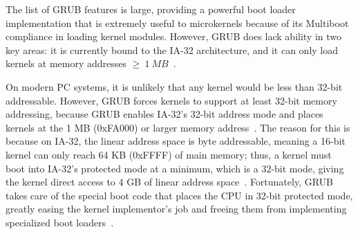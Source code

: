 The list of GRUB features is large, providing a powerful boot loader
implementation that is extremely useful to microkernels because of
its Multiboot compliance in loading kernel modules.  However, GRUB
does lack ability in two key areas: it is currently bound to the IA-32
architecture, and it can only load kernels at memory addresses
$\geq~1~MB$~\cite{grub_info}.

On modern PC systems, it is unlikely that any kernel would be less than 32-bit
addressable.  However, GRUB forces kernels to support at least 32-bit memory
addressing, because GRUB enables IA-32's 32-bit address mode and places
kernels at the 1 MB (0xFA000) or larger memory address~\cite{grub_info}.  The
reason for
this is because on IA-32, the linear address space is byte addressable,
meaning a 16-bit kernel can only reach 64 KB (0xFFFF) of main memory; thus, a
kernel
must boot into IA-32's protected mode at a minimum, which is a 32-bit mode,
giving the kernel direct access to 4 GB of linear address
space~\cite{ia32-1-2004}.  Fortunately, GRUB takes care of the special boot
code that places the CPU in 32-bit protected mode, greatly easing the kernel
implementor's job and freeing them from implementing specialized boot
loaders~\cite{grub_info}.
